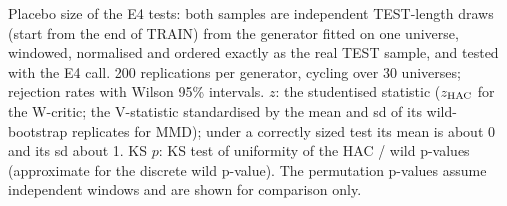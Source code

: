 Placebo size of the E4 tests: both samples are independent TEST-length draws (start from the end of TRAIN) from the generator fitted on one universe, windowed, normalised and ordered exactly as the real TEST sample, and tested with the E4 call. 200 replications per generator, cycling over 30 universes; rejection rates with Wilson 95\% intervals. $z$: the studentised statistic ($z_{\rm HAC}$ for the W-critic; the V-statistic standardised by the mean and sd of its wild-bootstrap replicates for MMD); under a correctly sized test its mean is about 0 and its sd about 1. KS $p$: KS test of uniformity of the HAC / wild p-values (approximate for the discrete wild p-value). The permutation p-values assume independent windows and are shown for comparison only.
